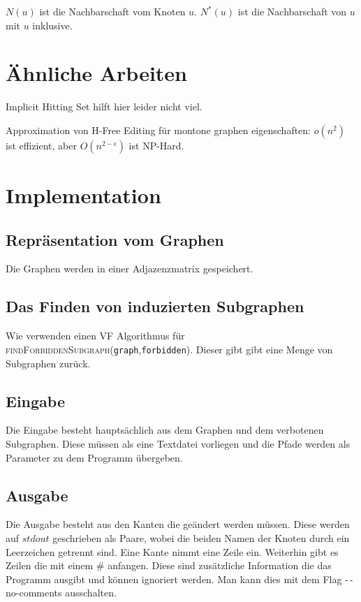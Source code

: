\documentclass[12pt,a4paper,onecolumn,oneside,titlepage]{article}
\newcommand{\vars}{\texttt}
\newcommand{\func}{\textsc}
\begin{document}
$N(u)$ ist die Nachbarschaft vom Knoten $u$. $N^{*}(u)$ ist die Nachbarschaft von $u$ mit $u$ inklusive.


\section{Ähnliche Arbeiten}
Implicit Hitting Set hilft hier leider nicht viel.\cite{Moreno13} 

Approximation von H-Free Editing für montone graphen eigenschaften: $o(n^2)$ ist effizient, aber $O(n^{2-\epsilon})$ ist NP-Hard.\cite{Alon09}

\section{Implementation}
\subsection{Repräsentation vom Graphen}
Die Graphen werden in einer Adjazenzmatrix gespeichert.


\subsection{Das Finden von induzierten Subgraphen}
\cite{Ullmann76}
Wie verwenden einen VF Algorithmus für \func{findForbiddenSubgraph}(\vars{graph},\vars{forbidden}).
Dieser gibt gibt eine Menge von Subgraphen zurück.
\subsection{Eingabe}
Die Eingabe besteht hauptsächlich aus dem Graphen und dem verbotenen Subgraphen. Diese müssen als eine Textdatei vorliegen und die Pfade werden als Parameter zu dem Programm übergeben.

\subsection{Ausgabe}
Die Ausgabe besteht aus den Kanten die geändert werden müssen. Diese werden auf $stdout$ geschrieben als Paare, wobei die beiden Namen der Knoten durch ein Leerzeichen getrennt sind. Eine Kante nimmt eine Zeile ein.
Weiterhin gibt es Zeilen die mit einem \# anfangen. Diese sind zusätzliche Information die das Programm ausgibt und können ignoriert werden. Man kann dies mit dem Flag -\,-no-comments ausschalten.
\end{document}

